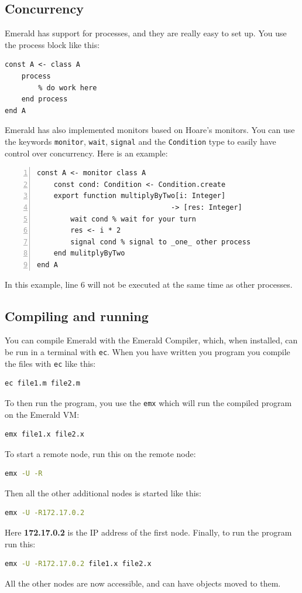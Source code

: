 \subsection{Concurrency}
Emerald has support for processes, and they are really easy to set up. You use the process block like this:
\begin{lstlisting}[language=emerald]
const A <- class A
    process
        % do work here
    end process
end A
\end{lstlisting}

Emerald has also implemented monitors based on Hoare's monitors\cite{hoare_monitors_1974}. You can use the keywords \verb|monitor|, \verb|wait|, \verb|signal| and the \verb|Condition| type to easily have control over concurrency. Here is an example:
\begin{lstlisting}[language=emerald, numbers=left]
const A <- monitor class A
    const cond: Condition <- Condition.create
    export function multiplyByTwo[i: Integer] 
                                -> [res: Integer]
        wait cond % wait for your turn
        res <- i * 2
        signal cond % signal to _one_ other process
    end mulitplyByTwo
end A
\end{lstlisting}
In this example, line 6 will not be executed at the same time as other processes.







\subsection{Compiling and running}
You can compile Emerald with the Emerald Compiler\cite{noauthor_emeraldold-emerald_2019}, which, when installed, can be run in a terminal with \verb|ec|. When you have written you program you compile the files with \verb|ec| like this:
\begin{lstlisting}[language=Bash]
ec file1.m file2.m 
\end{lstlisting}
To then run the program, you use the \verb|emx| which will run the compiled program on the Emerald VM:
\begin{lstlisting}[language=Bash]
emx file1.x file2.x
\end{lstlisting}

To start a remote node, run this on the remote node:
\begin{lstlisting}[language=Bash]
emx -U -R
\end{lstlisting}
Then all the other additional nodes is started like this:
\begin{lstlisting}[language=Bash]
emx -U -R172.17.0.2
\end{lstlisting}
Here \textbf{172.17.0.2} is the IP address of the first node.
Finally, to run the program run this:
\begin{lstlisting}[language=Bash]
emx -U -R172.17.0.2 file1.x file2.x
\end{lstlisting}
All the other nodes are now accessible, and can have objects moved to them.



